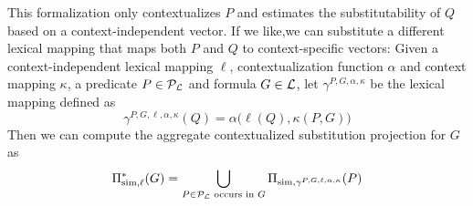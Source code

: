 This formalization only contextualizes $P$ and estimates the substitutability of
$Q$ based on a context-independent vector. If we like,we can substitute a
different lexical mapping that maps both $P$ and $Q$ to context-specific
vectors: Given a context-independent lexical mapping $\ell$, contextualization
function $\alpha$ and context mapping $\kappa$, a predicate $P \in
{\cal{P}}_{{\cal{L}}}$ and formula $G \in {\cal{L}}$, let $\gamma^{P, G, \alpha,
\kappa}$ be the lexical mapping defined as \[\gamma^{P, G, \ell, \alpha,
\kappa}(Q) = \alpha\big(\ell(Q), \kappa(P, G)\big) \] Then we can compute the
aggregate contextualized substitution projection for $G$ as \[\Pi^*_{\mathrm{sim}, \ell}(G)
= \bigcup_{P \in {\cal{P}}_{{\cal{L}}} \text{ occurs in } G} \Pi_{\mathrm{sim}, \gamma^{P, G, \ell, \alpha,
\kappa}}(P) \]

